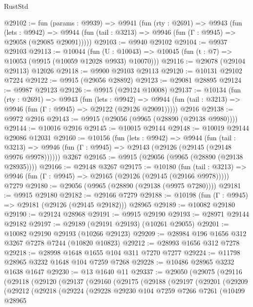 \begin{lexlean}{RustStd}
\begin{coremodule}
{\begin{coremodule}
{{{{{{{{{{{{{{{{{{{{{{{{{@29102 := fun (params : @9939) =>
  @9941
    (fun (rty : @2691) =>
    @9943
      (fun (lets : @9942) =>
      @9944 (fun (tail : @3213) => @9946 (fun (Γ : @9945) => @29058 (@29085 @29091)))))
@29103 := @9940 @29102
@29104 := @9937 @29103
@29113 := @10044
    (fun (U : @10043) => @10045 (fun (t : @7) => @10053 (@9915 (@10059 @12028 @9933) @10070)))
@29116 := @29078 (@29104 @29113) @12026
@29118 := @9900 @29103 @29113
@29120 := @10131 @29102 @7224
@29122 := @9915 (@29056 @28892)
@29123 := @29081 @28895
@29124 := @9987 @29123
@29126 := @9915 (@29124 @10008)
@29137 := @10134
    (fun (rty : @2691) =>
    @9943
      (fun (lets : @9942) =>
      @9944 (fun (tail : @3213) => @9946 (fun (Γ : @9945) => @29122 (@29126 @29091)))))
    @2916
@29138 := @9972 @2916
@29143 := @9915 (@29056 (@9965 (@28890 (@29138 @9980))))
@29144 := @10016 @2916
@29145 := @10015 @29144
@29148 := @10019 @29144 @29086 @12031
@29160 := @10156
    (fun (lets : @9942) =>
    @9944
      (fun (tail : @3213) =>
      @9946 (fun (Γ : @9945) => @29143 (@29126 (@29145 (@29148 @9976 @9978))))))
    @3267
@29165 := @9915 (@29056 (@9965 (@28890 (@29138 @28935))))
@29166 := @29148 @3267
@29175 := @10180
    (fun (tail : @3213) => @9946 (fun (Γ : @9945) => @29165 (@29126 (@29145 (@29166 @9978)))))
    @7279
@29180 := @29056 (@9965 (@28890 (@29138 (@9975 @7280))))
@29181 := @9915 @29180
@29182 := @29166 @7279
@29188 := @10198 (fun (Γ : @9945) => @29181 (@29126 (@29145 @29182))) @28965
@29189 := @10082 @29180
@29190 := @29124 @28968
@29191 := @9915 @29190
@29193 := @28971 @29144 @29182
@29197 := @29189 (@29191 @29193) (@10261 @29055)
@29201 := @10082 @29190 @29193 (@10266 @29123)
@29209 := @28984 @196 @1656 @312 @3267 @7278 @7244 (@10820 @10823)
@29212 := @28993 @1656 @312 @7278
@29218 := @28998 @1648 @1655 @104 @311 @7270 @7277
@29224 := @11798 @28965 @3232 @1648 @104 @7259 @7268
@29228 := @10486 @28965 @3232 @1638 @1647
@29230 := @13 @1640 @11
@29337 := @29050
    (@29075
      (@29116
        (@29118
          (@29120
            (@29137
              (@29160
                (@29175
                  (@29188
                    (@29197
                      (@29201
                        (@29209
                          (@29212
                            (@29218
                              (@29224
                                (@29228
                                  @29230
                                  @104
                                  @7259
                                  @7266
                                  @7261
                                  (@10499
                                    @28965
}}}}}}}}}}}}}}}}}}}}}}}}}
\end{coremodule}}
\end{coremodule}
\end{lexlean}
